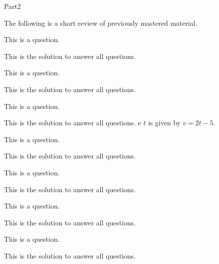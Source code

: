 \documentclass[10pt]{article}
\begin{document}
\begin{exam}[Part II.]{Part2}

\begin{instructions}[Part II.]
The following is a short review of previously mastered material.
\end{instructions}

\begin{problem}[5]
This is a question.
\begin{solution}[.5in]
This is the solution to answer all questions.
\end{solution}
\end{problem}

\begin{problem}[7]
This is a question.
\begin{solution}[.5in]
This is the solution to answer all questions.
\end{solution}
\end{problem}

\begin{problem}[8]
This is a question.
\begin{solution}[1in]
This is the solution to answer all questions.
e $t$ is given by $\boxed{v=2t-5}$.
\end{solution}
\end{problem}

\begin{problem}[5]
This is a question.
\begin{solution}[1in]
This is the solution to answer all questions.
\end{solution}
\end{problem}

\begin{problem}[10]
This is a question.
\begin{solution}[1in]
This is the solution to answer all questions.
\end{solution}
\end{problem}

\begin{problem}[5]
This is a question.
\begin{solution}[1in]
This is the solution to answer all questions.
\end{solution}
\end{problem}

\begin{problem}[10]
This is a question.
\begin{solution}[1in]
This is the solution to answer all questions.
\end{solution}
\end{problem}
\end{exam}
\end{document}
